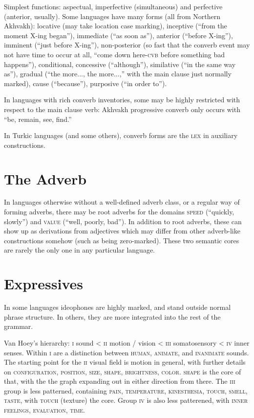 \documentclass[11pt]{article}
\newcommand{\I}[1]{\textsc{#1}}   %
\begin{document}
{Simplest functions: aspectual, imperfective (simultaneous) and
perfective (anterior, usually). Some languages have many forms (all
from Northern Akhvakh): locative (may take location case marking),
inceptive (``from the moment X-ing began''), immediate (``as soon
as''), anterior (``before X-ing''), imminent (``just before X-ing''),
non-posterior (so fast that the converb event may not have time to
occur at all, ``come down here-\I{cvb} before something bad
happens''), conditional, concessive (``although''), similative (``in
the same way as''), gradual (``the more..., the more...,'' with the
main clause just normally marked), cause (``because''), purposive
(``in order to'').

In languages with rich converb inventories, some may be highly
restricted with respect to the main clause verb: Akhvakh progressive
converb only occurs with ``be, remain, see, find.''

In Turkic languages (and some others), converb forms are the \I{lex}
in auxiliary constructions.


\section{The Adverb}
In languages otherwise without a well-defined adverb class, or a
regular way of forming adverbs, there may be root adverbs for the
domains \I{speed} (``quickly, slowly'') and \I{value} (``well,
poorly, bad''). In addition to root adverbs, these can show up as
derivations from adjectives which may differ from other adverb-like
constructions somehow (such as being zero-marked). These two semantic
cores are rarely the only one in any particular language.


\section{Expressives}
In some languages ideophones are highly marked, and stand outside
normal phrase structure.  In others, they are more integrated into the
rest of the grammar.

Van Hoey's hierarchy: \I{i} sound < \I{ii} motion / vision < \I{iii}
somatosensory < \I{iv} inner senses.  Within \I{i} are a distinction
between \I{human}, \I{animate}, and \I{inanimate} sounds.  The
starting point for the \I{ii} visual field is motion in general, with
further details on \I{configuration, position, size, shape,
brightness, color}.  \I{shape} is the core of that, with the the
graph expanding out in either direction from there.  The \I{iii} group
is less patterned, containing \I{pain, temperature, kinesthesia,
touch, smell, taste,} with \I{touch} (texture) the core.  Group
\I{iv} is also less patterened, with \I{inner feelings, evaluation,
time}.

}
\end{document}
